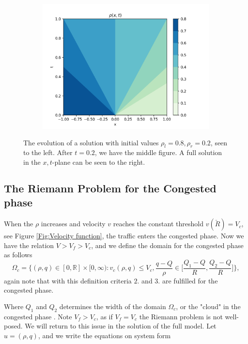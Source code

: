 \documentclass[10pt]{article}
\numberwithin{equation}{section}
\begin{document}
\begin{figure}
     \begin{subfigure}[b]{0.3\textwidth}
         \centering
         \includegraphics[width=\textwidth]{Figures/Model/RarefactionFull.png}
     \end{subfigure}
        \caption{The evolution of a solution with initial values $\rho_l = 0.8, \rho_r = 0.2$, seen to the left. After $t = 0.2$, we have the middle figure. A full solution in the $x,t$-plane can be seen to the right.}
        \label{fig:ExampleRarefaction}
\end{figure}

\subsection{The Riemann Problem for the Congested phase}\label{RPCongPh}

When the $\rho$ increases and velocity $v$ reaches the constant threshold $v(\check R) = V_c$, see Figure \ref{Fig:Velocity function}, the traffic enters the congested phase. Now we have the relation $ V > V_f > V_c $, and we define the domain for the congested phase as follows \begin{equation}
    \Omega_c = \Bigg\{(\rho, q) \in [0, \mathbb{R}] \times [0, \infty) : v_c(\rho, q) \leq V_c, \frac{q-Q}{\rho} \in \Bigg[\frac{Q_1 - Q}{R}, \frac{Q_2 - Q}{R} \Bigg]  \Bigg\},
    \label{Domain congested ph}
\end{equation} again note that with this definition criteria $2.$ and $3.$ are fulfilled for the congested phase. 
\begin{figure}
    
\end{figure}{}
Where $Q_1$ and $Q_2$ determines the width of the domain $\Omega_{c}$, or the "cloud" in the congested phase \cite{Colombo2003}. Note $V_f > V_c$, as if $V_f = V_c$ the Riemann problem is not well-posed. We will return to this issue in the solution of the full model. Let $ u = (\rho, q)$, and we write the equations on system form
\end{document}
